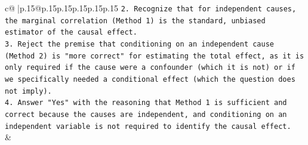 \documentclass{article}
\begin{document}
{\begin{supertabular}{c@{$\;$}|p{.15\linewidth}@{}p{.15\linewidth}p{.15\linewidth}p{.15\linewidth}p{.15\linewidth}p{.15\linewidth}}
{{{\texttt{2.  Recognize that for independent causes, the marginal correlation (Method 1) is the standard, unbiased estimator of the causal effect.} \\
\texttt{3.  Reject the premise that conditioning on an independent cause (Method 2) is "more correct" for estimating the total effect, as it is only required if the cause were a confounder (which it is not) or if we specifically needed a conditional effect (which the question does not imply).} \\
\texttt{4.  Answer "Yes" with the reasoning that Method 1 is sufficient and correct because the causes are independent, and conditioning on an independent variable is not required to identify the causal effect.} \\
            }
        }
    }
    & \\ \\

\end{supertabular}
}
\end{document}
